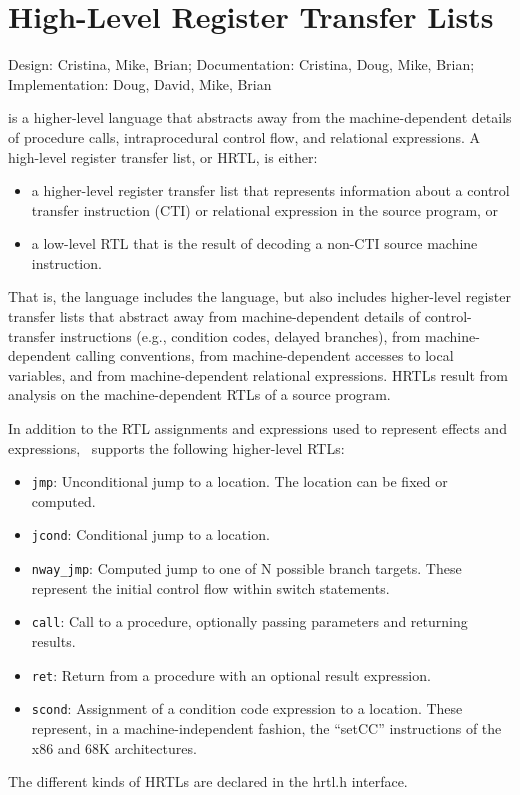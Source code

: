 \section{High-Level Register Transfer Lists}
\label{sec-hrtl}

{\small
\begin{flushright}
Design: Cristina, Mike, Brian; Documentation: Cristina, Doug, Mike, Brian;
 Implementation: Doug, David, Mike, Brian
\end{flushright} 
}

{\hrtl} is a higher-level language that abstracts away from
the machine-dependent details of procedure calls,
intraprocedural control flow, and relational expressions.
A high-level register transfer list, or HRTL, is either:
\begin{itemize}
\item a higher-level register transfer list
that represents information about a control transfer instruction (CTI)
or relational expression in the source program, or
\item a low-level RTL that is the result
of decoding a non-CTI source machine instruction.
\end{itemize}
That is, the {\hrtl} language includes the {\rtl} language,
but also includes higher-level register transfer lists that
abstract away from machine-dependent details
of control-transfer instructions
(e.g., condition codes, delayed branches),
from machine-dependent calling conventions,
from machine-dependent accesses to local variables,
and from machine-dependent relational expressions.
HRTLs result from analysis on the machine-dependent RTLs
of a source program.

In addition to the RTL assignments and expressions
used to represent effects and expressions,
\hrtl\ supports the following higher-level RTLs:
\begin{itemize}
\item \texttt{jmp}: Unconditional jump to a location.
The location can be fixed or computed.
\item \texttt{jcond}: Conditional jump to a location.
\item \texttt{nway\_jmp}: Computed jump to one of N possible branch targets.
These represent the initial control flow within switch statements.
\item \texttt{call}: Call to a procedure,
optionally passing parameters and returning results.
\item \texttt{ret}: Return from a procedure with an optional result expression.
\item \texttt{scond}: Assignment of a condition code expression to a location.
These represent, in a machine-independent fashion,
the ``setCC'' instructions of the x86 and 68K architectures.
\end{itemize}
The different kinds of HRTLs are declared in the hrtl.h interface.

